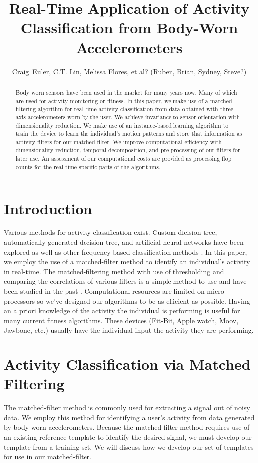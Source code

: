\documentclass[journal]{IEEEtran}
\begin{document}
%
\title{Real-Time Application of Activity Classification from Body-Worn Accelerometers}
%
\author{Craig~Euler, C.T. Lin, Melissa Flores, et al? (Ruben, Brian, Sydney, Steve?)}
%
\maketitle
%
\begin{abstract}
Body worn sensors have been used in the market for many years now.
Many of which are used for activity monitoring or fitness.
In this paper, we make use of a matched-filtering algorithm for real-time activity classification from data obtained with three-axis accelerometers worn by the user.
We achieve invariance to sensor orientation with dimensionality reduction.
We make use of an instance-based learning algorithm to train the device to learn the individual's motion patterns and store that information as activity filters for our matched filter.
We improve computational efficiency with dimensionality reduction, temporal decomposition, and pre-processing of our filters for later use.
An assessment of our computational costs are provided as processing flop counts for the real-time specific parts of the algorithms.
\end{abstract}
%
\section{Introduction}
Various methods for activity classification exist.
Custom dicision tree, automatically generated decision tree, and artificial neural networks \cite{parkka_ermes_korpipaa_mantyjarvi_peltola_korhonen_2006} have been explored as well as other frequency based classification methods \cite{sharma_purwar_lee_lee_chung_2008}.
In this paper, we employ the use of a matched-filter method to identify an individual’s activity in real-time.
The matched-filtering method with use of thresholding and comparing the correlations of various filters is a simple method to use and have been studied in the past \cite{giannakis_tsatsanis_1990}.
Computational resources are limited on micro-processors so we've designed our algorithms to be as efficient as possible.
Having an a priori knowledge of the activity the individual is performing is useful for many current fitness algorithms.
These devices (Fit-Bit, Apple watch, Moov, Jawbone, etc.) usually have the individual input the activity they are performing.
%
\section{Activity Classification via Matched Filtering}
The matched-filter method is commonly used for extracting a signal out of noisy data.
We employ this method for identifying a user’s activity from data generated by body-worn accelerometers.
Because the matched-filter method requires use of an existing reference template to identify the desired signal, we must develop our template from a training set.
We will discuss how we develop our set of templates for use in our matched-filter.
%
\end{document}
